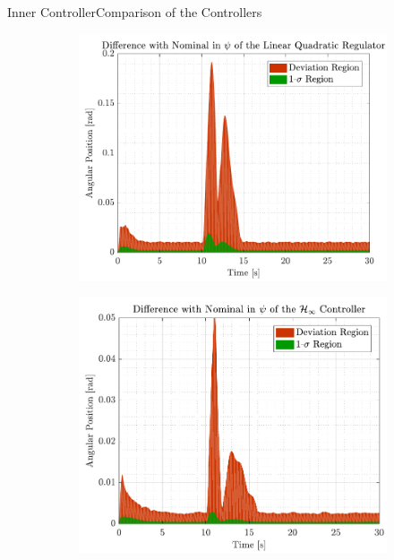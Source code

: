 \begin{frame}{Inner Controller}{Comparison of the Controllers}
  \begin{figure}[H]
    \begin{minipage}{0.45\linewidth}
      \begin{figure}[H]
        \centering
        \includegraphics[width=1\linewidth]{figures/yaw_mc_lqr_error}
      \end{figure}        
    \end{minipage}\hfill      
    \begin{minipage}{0.45\linewidth}
      \begin{figure}[H]
        \centering
        \includegraphics[width=1\linewidth]{figures/yaw_mc_rob_error}
      \end{figure}                
    \end{minipage}\hfill \\
  \end{figure}
\end{frame}

